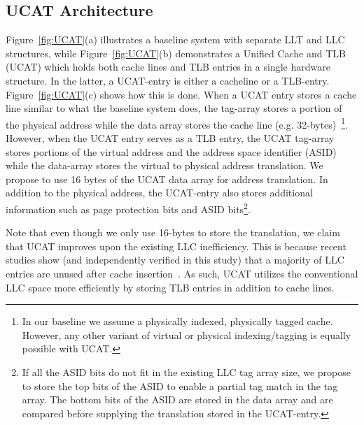 
\subsection{UCAT Architecture}

\noindent Figure~\ref{fig:UCAT}(a) illustrates a baseline system with
separate LLT and LLC structures, while Figure~\ref{fig:UCAT}(b)
demonstrates a Unified Cache and TLB (UCAT) which holds both cache
lines and TLB entries in a single hardware structure. In the latter, a
UCAT-entry is either a cacheline or a TLB-entry.
Figure~\ref{fig:UCAT}(c) shows how this is done. When a UCAT entry
stores a cache line similar to what the baseline system does, the
tag-array stores a portion of the physical address while the data
array stores the cache line (e.g. 32-bytes)~\footnote{In our baseline
we assume a physically indexed, physically tagged cache. However, any
other variant of virtual or physical indexing/tagging is equally
possible with UCAT.}. However, when the UCAT entry serves as a TLB
entry, the UCAT tag-array stores portions of the virtual address and
the address space identifier (ASID) while the data-array stores the
virtual to physical address translation. We propose to use 16 bytes of
the UCAT data array for address translation. In addition to the
physical address, the UCAT-entry also stores additional information
such as page protection bits and ASID bits\footnote{If all the ASID
bits do not fit in the existing LLC tag array size, we propose to
store the top bits of the ASID to enable a partial tag match in the
tag array. The bottom bits of the ASID are stored in the data array
and are compared before supplying the translation stored in the
UCAT-entry.}.

Note that even though we only use 16-bytes to store the translation,
we claim that UCAT improves upon the existing LLC inefficiency. This
is because recent studies show (and independently verified in this
study) that a majority of LLC entries are unused after cache
insertion~\cite{}. As such, UCAT utilizes the conventional LLC space
more efficiently by storing TLB entries in addition to cache lines.

